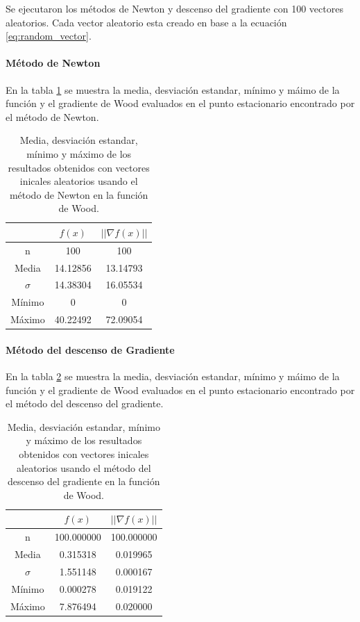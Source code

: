 Se ejecutaron los métodos de Newton y descenso del gradiente con 100 vectores aleatorios. Cada vector aleatorio esta creado en base a la ecuación \ref{eq:random_vector}.

\paragraph{Método de Newton}

En la tabla \ref{table:wood_4_random_newton} se muestra la media, desviación estandar, mínimo y máimo de la función y el gradiente de Wood evaluados en el punto estacionario encontrado por el método de Newton.

\begin{table}[H]
    \centering
    \begin{tabular}{ccc} \hline
                 & $f(x)$   & $||\nabla f(x)||$ \\ \hline
        n        & 100      & 100               \\
        Media    & 14.12856 & 13.14793          \\
        $\sigma$ & 14.38304 & 16.05534          \\
        Mínimo   & 0        & 0                 \\
        Máximo   & 40.22492 & 72.09054          \\\hline
    \end{tabular}
    \caption{Media, desviación estandar, mínimo y máximo de los resultados obtenidos con vectores inicales aleatorios usando el método de Newton en la función de Wood.}
    \label{table:wood_4_random_newton}
\end{table}


\paragraph{Método del descenso de Gradiente}

En la tabla \ref{table:wood_4_random_gradient} se muestra la media, desviación estandar, mínimo y máimo de la función y el gradiente de Wood evaluados en el punto estacionario encontrado por el método del descenso del gradiente.

\begin{table}[H]
    \centering
    \begin{tabular}{ccc} \hline
                 & $f(x)$     & $||\nabla f(x)||$ \\ \hline
        n        & 100.000000 & 100.000000        \\
        Media    & 0.315318   & 0.019965          \\
        $\sigma$ & 1.551148   & 0.000167          \\
        Mínimo   & 0.000278   & 0.019122          \\
        Máximo   & 7.876494   & 0.020000          \\ \hline
    \end{tabular}
    \caption{Media, desviación estandar, mínimo y máximo de los resultados obtenidos con vectores inicales aleatorios usando el método del descenso del gradiente en la función de Wood.}
    \label{table:wood_4_random_gradient}
\end{table}
